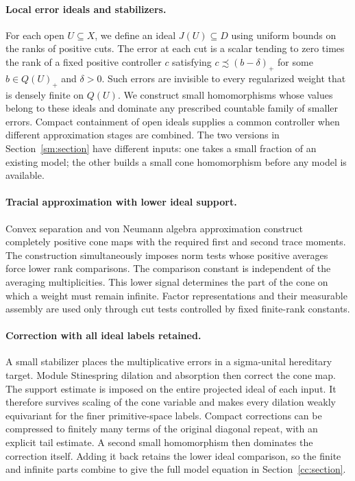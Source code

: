 \paragraph{Local error ideals and stabilizers.}
For each open \(U\subseteq X\), we define an ideal \(J(U)\subseteq D\)
using uniform bounds on the ranks of positive cuts.
The error at each cut is a scalar tending to zero times the rank of
a fixed positive controller $c$ satisfying
$c\precsim(b-\delta)_+$ for some $b\in Q(U)_+$ and $\delta>0$.
Such errors are invisible to every regularized weight that is densely
finite on \(Q(U)\).
We construct small homomorphisms whose values belong to these ideals
and dominate any prescribed countable family of smaller errors.
Compact containment of open ideals supplies a common controller
when different approximation stages are combined.
The two versions in Section~\ref{sm:section} have different inputs:
one takes a small fraction of an existing model; the other builds a
small cone homomorphism before any model is available.

\paragraph{Tracial approximation with lower ideal support.}
Convex separation and von Neumann algebra approximation construct
completely positive cone maps with the required first and second
trace moments. The construction simultaneously imposes norm tests
whose positive averages force lower rank comparisons.
The comparison constant is independent of the averaging
multiplicities. This lower signal determines the part of the cone
on which a weight must remain infinite.
Factor representations and their measurable assembly are used only
through cut tests controlled by fixed finite-rank constants.

\paragraph{Correction with all ideal labels retained.}
A small stabilizer places the multiplicative errors in a
sigma-unital hereditary target. Module Stinespring dilation and
absorption then correct the cone map.
The support estimate is imposed on the entire projected ideal of
each input. It therefore survives scaling of the cone variable and
makes every dilation weakly equivariant for the finer primitive-space
labels. Compact corrections can be compressed to finitely many terms
of the original diagonal repeat, with an explicit tail estimate.
A second small homomorphism then dominates the correction itself.
Adding it back retains the lower ideal comparison, so the finite and
infinite parts combine to give the full model equation in
Section~\ref{cc:section}.


